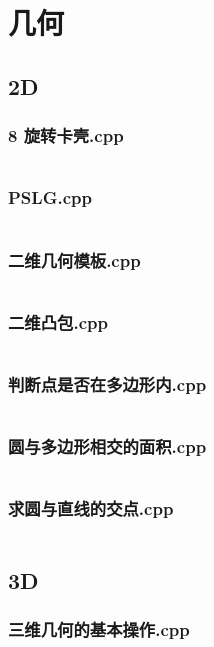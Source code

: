 \documentclass[a4paper,11pt]{article}
\begin{document}
\section{几何}
\subsection{2D}
\subsubsection{8 旋转卡壳.cpp}
\inputminted[breaklines]{c++}{"D:/tmplz/templates/几何/2D/8 旋转卡壳.cpp"}
\subsubsection{PSLG.cpp}
\inputminted[breaklines]{c++}{"D:/tmplz/templates/几何/2D/PSLG.cpp"}
\subsubsection{二维几何模板.cpp}
\inputminted[breaklines]{c++}{"D:/tmplz/templates/几何/2D/二维几何模板.cpp"}
\subsubsection{二维凸包.cpp}
\inputminted[breaklines]{c++}{"D:/tmplz/templates/几何/2D/二维凸包.cpp"}
\subsubsection{判断点是否在多边形内.cpp}
\inputminted[breaklines]{c++}{"D:/tmplz/templates/几何/2D/判断点是否在多边形内.cpp"}
\subsubsection{圆与多边形相交的面积.cpp}
\inputminted[breaklines]{c++}{"D:/tmplz/templates/几何/2D/圆与多边形相交的面积.cpp"}
\subsubsection{求圆与直线的交点.cpp}
\inputminted[breaklines]{c++}{"D:/tmplz/templates/几何/2D/求圆与直线的交点.cpp"}
\subsection{3D}
\subsubsection{三维几何的基本操作.cpp}
\inputminted[breaklines]{c++}{"D:/tmplz/templates/几何/3D/三维几何的基本操作.cpp"}
\end{document}
